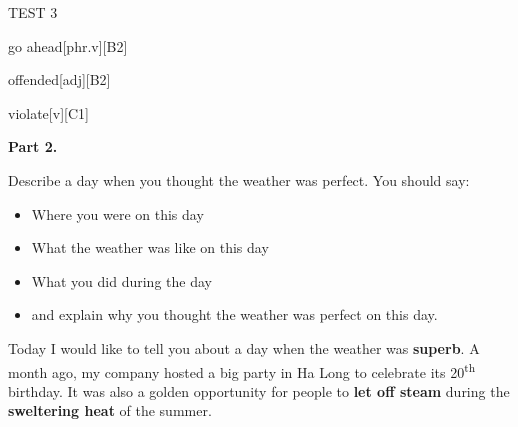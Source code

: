 \begin{glossarymc}[Cambridge 11]
\begin{test}{TEST 3}
\begin{VocabExplain}[Part 1]
            \begin{ExplainCard}{go ahead}[phr.v][B2]
            \end{ExplainCard}

            \begin{ExplainCard}{offended}[adj][B2]
            \end{ExplainCard}

            \begin{ExplainCard}{violate}[v][C1]
            \end{ExplainCard}
        \end{VocabExplain}

    \noindent
    \textbf{Part 2.}
    \begin{qa}{Describe a day when you thought the weather was perfect. You should say:}
    \begin{itemize}
        \item Where you were on this day
        \item What the weather was like on this day
        \item What you did during the day
        \item and explain why you thought the weather was perfect on this day.
    \end{itemize}

    Today I would like to tell you about a day when the weather was \textbf{superb}. A month ago, my company hosted a big party in Ha Long to celebrate its 20\textsuperscript{th} birthday. It was also a golden opportunity for people to \textbf{let off steam} during the \textbf{sweltering heat} of the summer.  


\end{qa}
\end{test}
\end{glossarymc}
